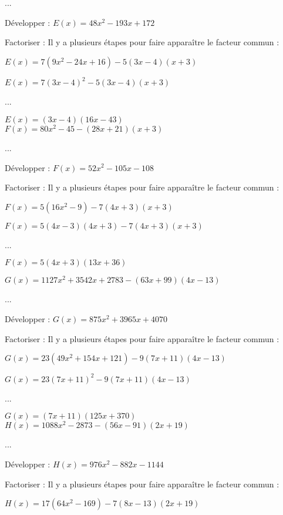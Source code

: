 ...

Développer : $ E(x) =48x^2-193x+172 $ 

Factoriser : Il y a plusieurs étapes pour faire apparaître le facteur commun :

$ E(x) =7\left(9x^2-24x+16\right)-5\left(3x-4\right)\left(x+3\right) $

$ E(x) = 7\left(3x-4\right)^2-5\left(3x-4\right)\left(x+3\right) $

...

$ E(x) = \left(3x-4\right)\left(16x-43\right) $ \\

$ F(x) = 80x^2-45-\left(28x+21\right)\left(x+3\right) $

...

Développer : $ F(x) = 52x^2 - 105x - 108 $

Factoriser : Il y a plusieurs étapes pour faire apparaître le facteur commun :

$ F(x) = 5\left(16x^2-9\right)-7\left(4x+3\right)\left(x+3\right) $

$ F(x) = 5\left(4x-3\right)\left(4x+3\right)-7\left(4x+3\right)\left(x+3\right) $

...

$ F(x) = 5\left(4x+3\right)\left(13x+36\right)$

\newpage

$ G(x) = 1127x^2 + 3542x + 2783 - \left(63x + 99\right)\left(4x-13\right) $

...

Développer : $ G(x) = 875x^2 + 3965x + 4070 $

Factoriser : Il y a plusieurs étapes pour faire apparaître le facteur commun :

$ G(x) = 23\left(49x^2 + 154x + 121\right) - 9\left(7x + 11\right)\left(4x-13\right) $

$ G(x) = 23\left(7x+11\right)^2 - 9\left(7x + 11\right)\left(4x-13\right) $

...

$ G(x) = \left(7x+11\right)\left(125x+370\right) $ \\

$ H(x) = 1088x^2 - 2873 - \left(56x-91\right)\left(2x+19\right) $

...

Développer : $ H(x) = 976x^2 - 882x - 1144 $

Factoriser : Il y a plusieurs étapes pour faire apparaître le facteur commun :

$ H(x) = 17\left(64x^2 - 169\right) - 7\left(8x-13\right)\left(2x+19\right) $

